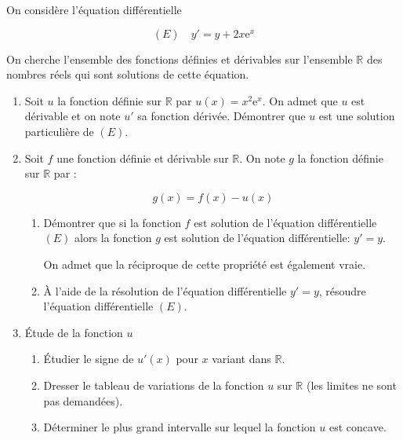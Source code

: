 \documentclass[11pt,a4paper,french]{article}
\newcommand{\R}{\mathbb{R}}
\newcommand{\e}{\text{e}}
\begin{document}
\bigskip

On considère l’équation différentielle 

\[(E)\quad  y'= y + 2x\e^x\]
 
On cherche l'ensemble des fonctions définies et dérivables sur l'ensemble $\R$ des nombres réels qui sont solutions de cette équation. 

\begin{enumerate}
\item  Soit $u$ la fonction définie sur $\R$ par $u(x) = x^2\e^x$. On admet que $u$ est dérivable et on note $u'$ sa fonction dérivée. Démontrer que $u$ est une solution particulière de $(E)$. 

\item Soit $f$ une fonction définie et dérivable sur $\R$. On note $g$ la fonction définie sur $\R$ par : 

\[g(x) = f(x) - u(x)\]

	\begin{enumerate}
		\item  Démontrer que si la fonction $f$ est solution de l'équation différentielle $(E)$ alors la fonction $g$ est solution de l'équation différentielle: $y' =y$. 

On admet que la réciproque de cette propriété est également vraie. 
		\item À l'aide de la résolution de l'équation différentielle $y' =y$, résoudre l'équation différentielle $(E)$. 
	\end{enumerate}
\item Étude de la fonction $u $
	\begin{enumerate}
		\item  Étudier le signe de $u' (x)$ pour $x$ variant dans $\R$. 
		\item Dresser le tableau de variations de la fonction $u$ sur $\R$ (les limites ne sont pas demandées). 
		\item Déterminer le plus grand intervalle sur lequel la fonction $u$ est concave. 
\end{enumerate}
\end{enumerate}
\end{document}
